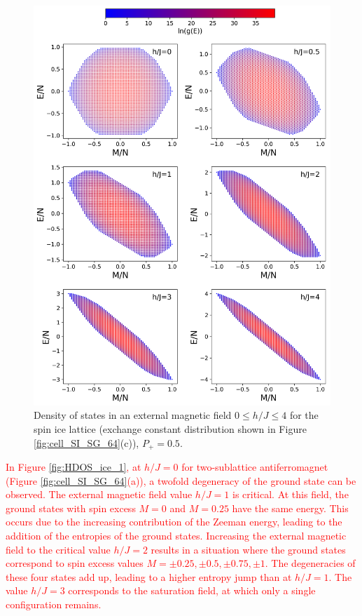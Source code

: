 \documentclass[preprint,12pt]{elsarticle}
\begin{document}
	
	\begin{figure}[H]
		\centering
		\includegraphics[width=1\linewidth]{pictures/HDOS_SI_64_J0.png}
		\caption{Density of states in an external magnetic field $0\leq h/J \leq 4$ for the spin ice lattice (exchange constant distribution shown in Figure \ref{fig:cell_SI_SG_64}(c)), $P_+ = 0.5$.}
		\label{fig:HDOS_ice}
	\end{figure}
	
	\textcolor{red}{In Figure \ref{fig:HDOS_ice_1}, at $h/J = 0$ for \textcolor{red}{two-sublattice antiferromagnet} (Figure \ref{fig:cell_SI_SG_64}(a)), a twofold degeneracy of the ground state can be observed. The external magnetic field value $h/J = 1$ is critical. At this field, the ground states with spin excess $M = 0$ and $M = 0.25$ have the same energy. This occurs due to the increasing contribution of the Zeeman energy, leading to the addition of the entropies of the ground states.  
	Increasing the external magnetic field to the critical value $h/J = 2$ results in a situation where the ground states correspond to spin excess values $M = \pm0.25, \pm0.5, \pm0.75, \pm1$. The degeneracies of these four states add up, leading to a higher entropy jump than at $h/J = 1$.  
	The value $h/J = 3$ corresponds to the saturation field, at which only a single configuration remains.}
	
\end{document}
